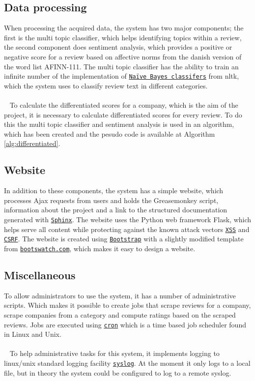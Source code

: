 \documentclass[10pt]{IEEEtran}
\begin{document}
\subsection{Data processing}
When processing the acquired data, the system has two major components; the first is the multi topic classifier, which helps identifying topics within a review, the second component does sentiment analysis, which provides a positive or negative score for a review based on affective norms from the danish version of the word list AFINN-111\cite{IMM2011-06010}. The multi topic classifier has the ability to train an infinite number of the implementation of \href{http://nltk.org/api/nltk.classify.html#module-nltk.classify.naivebayes}{\texttt{Naïve Bayes classifers}} from nltk, which the system uses to classify review text in different categories.
\\~
\\~
To calculate the differentiated scores for a company, which is the aim of the project, it is necessary to calculate differentiated scores for every review. To do this the multi topic classifier and sentiment analysis is used in an algorithm, which has been created and the pesudo code is available at Algorithm \ref{alg:differentiated}.

\subsection{Website}
In addition to these components, the system has a simple website, which processes Ajax requests from users and holds the Greasemonkey script, information about the project and a link to the structured documentation generated with \href{http://sphinx-doc.org/}{\texttt{Sphinx}}. The website uses the Python web framework Flask, which helps serve all content while protecting against the known attack vectors \href{https://www.owasp.org/index.php/Cross-site_Scripting_(XSS)}{\texttt{XSS}} and \href{https://www.owasp.org/index.php/Cross-Site_Request_Forgery_(CSRF)}{\texttt{CSRF}}. The website is created using \href{http://getbootstrap.com/}{\texttt{Bootstrap}} with a slightly modified template from \href{http://bootswatch.com/flatly/}{\texttt{bootswatch.com}}, which makes it easy to design a website.

\subsection{Miscellaneous}
To allow administrators to use the system, it has a number of administrative scripts. Which makes it possible to create jobs that scrape reviews for a company, scrape companies from a category and compute ratings based on the scraped reviews. Jobs are executed using \href{http://pubs.opengroup.org/onlinepubs/009696699/utilities/crontab.html}{\texttt{cron}} which is a time based job scheduler found in Linux and Unix.
\\~
\\~
To help administrative tasks for this system, it implements logging to linux/unix standard logging facility \href{http://tools.ietf.org/html/rfc5424}{\texttt{syslog}}. At the moment it only logs to a local file, but in theory the system could be configured to log to a remote syslog.
\end{document}
